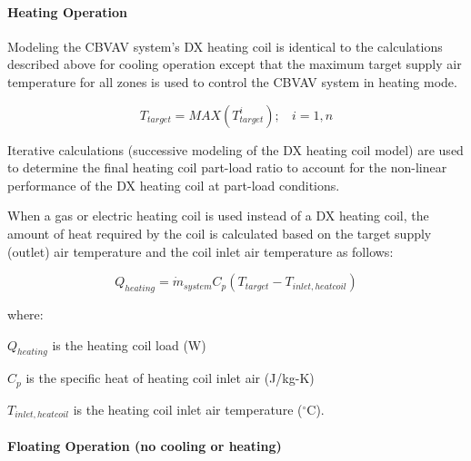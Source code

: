 \paragraph{Heating Operation}\label{heating-operation}

Modeling the CBVAV system's DX heating coil is identical to the calculations described above for cooling operation except that the maximum target supply air temperature for all zones is used to control the CBVAV system in heating mode.

\begin{equation}
{T_{target}} = MAX\left( {T_{target}^i} \right);~~~~i = 1,n
\end{equation}

Iterative calculations (successive modeling of the DX heating coil model) are used to determine the final heating coil part-load ratio to account for the non-linear performance of the DX heating coil at part-load conditions.

When a gas or electric heating coil is used instead of a DX heating coil, the amount of heat required by the coil is calculated based on the target supply (outlet) air temperature and the coil inlet air temperature as follows:

\begin{equation}
{Q_{heating}} = {\dot m_{system}}{C_p}({T_{target}} - {T_{inlet,heatcoil}})
\end{equation}

where:

\({Q_{heating}}\) is the heating coil load (W)

\({C_p}\) is the specific heat of heating coil inlet air (J/kg-K)

\({T_{inlet,heatcoil}}\) is the heating coil inlet air temperature (\(^{\circ}\)C).

\paragraph{Floating Operation (no cooling or heating)}\label{floating-operation-no-cooling-or-heating}

